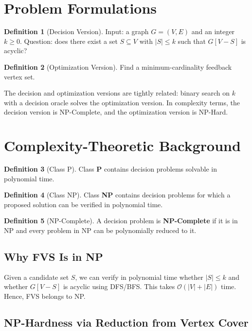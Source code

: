 \documentclass[10pt,a4paper]{report}
\theoremstyle{definition}
\newtheorem{definition}{Definition}[chapter]
\newcommand{\bigO}[1]{\mathcal{O}\!\left(#1\right)}
\begin{document}
\section{Problem Formulations}

\begin{definition}[Decision Version]
	Input: a graph $G=(V,E)$ and an integer $k\ge 0$. Question: does there exist a set $S\subseteq V$ with $|S|\le k$ such that $G[V - S]$ is acyclic?
\end{definition}

\begin{definition}[Optimization Version]
	Find a minimum-cardinality feedback vertex set.
\end{definition}

The decision and optimization versions are tightly related: binary search on $k$ with a decision oracle solves the optimization version. In complexity terms, the decision version is NP-Complete, and the optimization version is NP-Hard.

\section{Complexity-Theoretic Background}

\begin{definition}[Class P]
	Class \textbf{P} contains decision problems solvable in polynomial time.
\end{definition}

\begin{definition}[Class NP]
	Class \textbf{NP} contains decision problems for which a proposed solution can be verified in polynomial time.
\end{definition}

\begin{definition}[NP-Complete]
	A decision problem is \textbf{NP-Complete} if it is in NP and every problem in NP can be polynomially reduced to it.
\end{definition}

\subsection{Why FVS Is in NP}

Given a candidate set $S$, we can verify in polynomial time whether $|S|\le k$ and whether $G[V - S]$ is acyclic using DFS/BFS. This takes $\bigO{|V|+|E|}$ time. Hence, FVS belongs to NP.

\subsection{NP-Hardness via Reduction from Vertex Cover}
\end{document}
